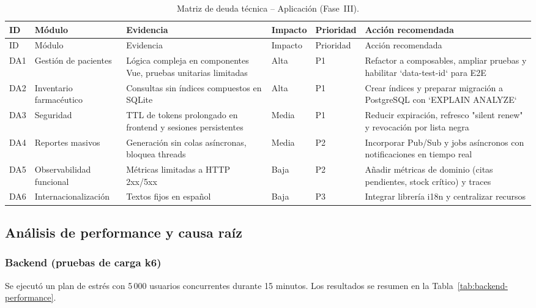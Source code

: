 \documentclass[12pt,a4paper]{article}
\begin{document}
\begin{longtable}{p{0.9cm} p{3.5cm} p{4.8cm} p{2.6cm} p{2.6cm} p{4.4cm}}
    \caption{Matriz de deuda técnica -- Aplicación (Fase~III).}\label{tab:deuda-app-fase3}\\
    \toprule
    ID & Módulo & Evidencia & Impacto & Prioridad & Acción recomendada \\
    \midrule
    \endfirsthead
    \toprule
    ID & Módulo & Evidencia & Impacto & Prioridad & Acción recomendada \\
    \midrule
    \endhead
    DA1 & Gestión de pacientes & Lógica compleja en componentes Vue, pruebas unitarias limitadas & Alta & P1 & Refactor a composables, ampliar pruebas y habilitar `data-test-id` para E2E \\
    DA2 & Inventario farmacéutico & Consultas sin índices compuestos en SQLite & Alta & P1 & Crear índices y preparar migración a PostgreSQL con `EXPLAIN ANALYZE` \\
    DA3 & Seguridad & TTL de tokens prolongado en frontend y sesiones persistentes & Media & P1 & Reducir expiración, refresco "silent renew" y revocación por lista negra \\
    DA4 & Reportes masivos & Generación sin colas asíncronas, bloquea threads & Media & P2 & Incorporar Pub/Sub y jobs asíncronos con notificaciones en tiempo real \\
    DA5 & Observabilidad funcional & Métricas limitadas a HTTP 2xx/5xx & Baja & P2 & Añadir métricas de dominio (citas pendientes, stock crítico) y traces \\
    DA6 & Internacionalización & Textos fijos en español & Baja & P3 & Integrar librería i18n y centralizar recursos \\
    \bottomrule
\end{longtable}

\subsection{Análisis de performance y causa raíz}

\subsubsection{Backend (pruebas de carga k6)}

Se ejecutó un plan de estrés con 5\,000 usuarios concurrentes durante 15 minutos. Los resultados se resumen en la Tabla~\ref{tab:backend-performance}.
\end{document}
